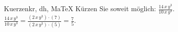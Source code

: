 \begin{MAufgabe}{Kuerzen}{kr, dh, MaTeX}
K\"urzen Sie soweit m\"oglich: $\frac{14\, x\, y^3}{10\, x\, y^3}$.\\ 
\ifLsg\MLoesung
\quad $\frac{14\, x\, y^3}{10\, x\, y^3}=\frac{(2\, x\, y^3)\cdot(7)}{(2\, x\, y^3)\cdot(5)}=\frac{7}{5}$.\else\relax\fi
 \end{MAufgabe}